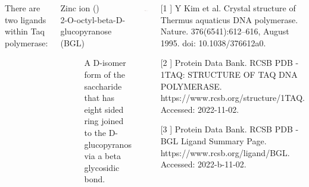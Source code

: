 \documentclass[14pt, a2paper, landscape]{tikzposter}
\begin{document}
\begin{columns}
    {
    There are two ligands within Taq polymerase:
    
	\begin{minipage}{0.5\linewidth}
    	    \begin{description}
    	\item[Zinc ion ()]
    	\item[2-O-octyl-beta-D-glucopyranose (BGL)]
    	A D-isomer form of the saccharide that has eight sided ring joined to the D-glucopyranos via a beta glycosidic bond.
    \end{description}
    \end{minipage}
    \begin{minipage}{0.5\linewidth}
    \centering
    	    \includegraphics[width=\linewidth]{BGL}
    	    
    \end{minipage}
    \vspace{-5em}
    }
    {
\begin{definition}
	\item[[1]] Y Kim et al. Crystal structure of Thermus aquaticus DNA polymerase. Nature. 376(6541):612–616, August 1995. doi: 10.1038/376612a0.
	\item[[2]] Protein Data Bank. RCSB PDB - 1TAQ: STRUCTURE OF TAQ DNA POLYMERASE. https://www.rcsb.org/structure/1TAQ. Accessed: 2022-11-02.
	\item[[3]] Protein Data Bank. RCSB PDB - BGL Ligand Summary Page. https://www.rcsb.org/ligand/BGL. Accessed: 2022-b-11-02.
\end{definition}



    }

    
    
   
\end{columns}
\end{document}
